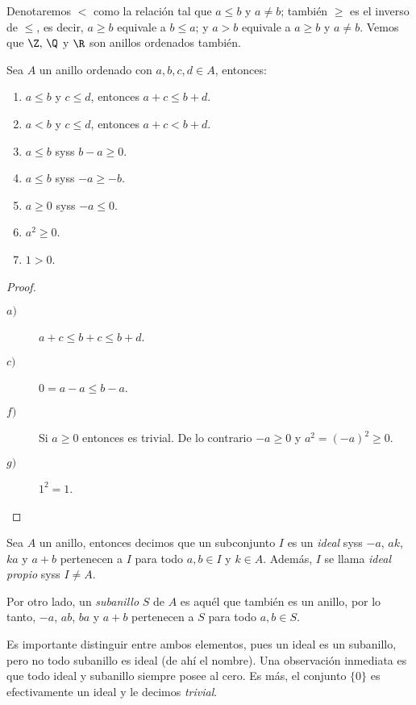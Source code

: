 \documentclass[11pt,oneside]{book}
\begin{document}
Denotaremos $\lt$ como la relación tal que $a\leq b$ y $a\neq b$; también $\geq$ es el inverso de $\leq$, es decir, $a\geq b$ equivale a $b\leq a$; y $a\gt b$ equivale a $a\geq b$ y $a\neq b$. Vemos que $\Z,\,\Q$ y $\R$ son anillos ordenados también.
\begin{thm}
Sea $A$ un anillo ordenado con $a,b,c,d\in A$, entonces:
\begin{enumerate}[$a)$]
\item $a\leq b$ y $c\leq d$, entonces $a+c\leq b+d$.
\item $a\lt b$ y $c\leq d$, entonces $a+c\lt b+d$.
\item $a\leq b$ syss $b-a\geq 0$.
\item $a\leq b$ syss $-a\geq -b$.
\item $a\geq 0$ syss $-a\leq 0$.
\item $a^2\geq 0$.
\item $1\gt 0$.
\end{enumerate}
\end{thm}
\begin{proof}
\begin{description}
\item[$a)$] $a+c\leq b+c\leq b+d$.
\item[$c)$] $0=a-a\leq b-a$.
\item[$f)$] Si $a\geq 0$ entonces es trivial. De lo contrario $-a\geq 0$ y $a^2=(-a)^2\geq 0$.
\item[$g)$] $1^2=1$.
\end{description}
\end{proof}
\begin{mydef}
Sea $A$ un anillo, entonces decimos que un subconjunto $I$ es un \textit{ideal} syss $-a$, $ak$, $ka$ y $a+b$ pertenecen a $I$ para todo $a,b\in I$ y $k\in A$. Además, $I$ se llama \textit{ideal propio} syss $I\neq A$.

Por otro lado, un \textit{subanillo} $S$ de $A$ es aquél que también es un anillo, por lo tanto, $-a$, $ab$, $ba$ y $a+b$ pertenecen a $S$ para todo $a,b\in S$.
\end{mydef}
Es importante distinguir entre ambos elementos, pues un ideal es un subanillo, pero no todo subanillo es ideal (de ahí el nombre). Una observación inmediata es que todo ideal y subanillo siempre posee al cero. Es más, el conjunto $\{0\}$ es efectivamente un ideal y le decimos \textit{trivial}.
\end{document}
